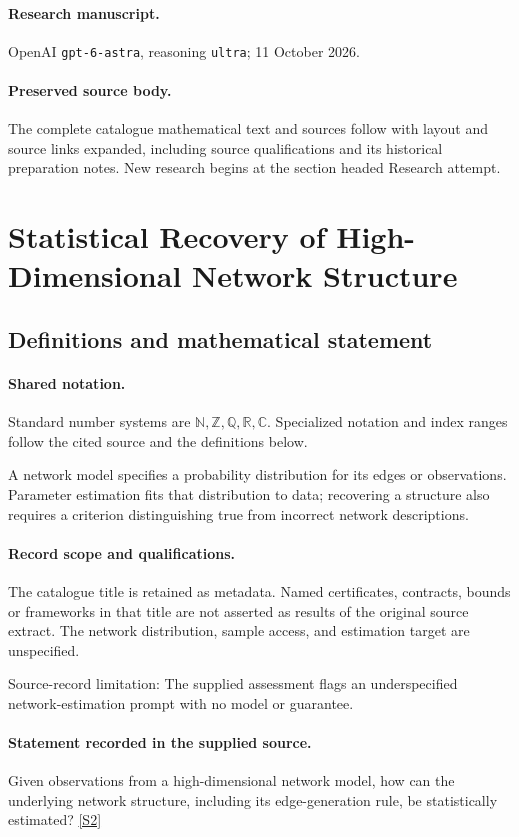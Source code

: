 \documentclass[11pt]{article}
\begin{document}
\paragraph{Research manuscript.} OpenAI \texttt{gpt-6-astra}, reasoning \texttt{ultra}; 11 October 2026.
\paragraph{Preserved source body.} The complete catalogue mathematical text and sources follow with layout and source links expanded, including source qualifications and its historical preparation notes. New research begins at the section headed Research attempt.

\section{Statistical Recovery of High-Dimensional Network Structure}\label{statement}

\subsection{Definitions and mathematical statement}

\paragraph{Shared notation.}Standard number systems are $\mathbb N,\mathbb Z,\mathbb Q,\mathbb R,\mathbb C$. Specialized notation and index ranges follow the cited source and the definitions below.


A network model specifies a probability distribution for its edges or observations. Parameter estimation fits that distribution to data; recovering a structure also requires a criterion distinguishing true from incorrect network descriptions.
\paragraph{Record scope and qualifications.}
The catalogue title is retained as metadata. Named certificates, contracts, bounds or frameworks in that title are not asserted as results of the original source extract.
The network distribution, sample access, and estimation target are unspecified.

Source-record limitation: The supplied assessment flags an underspecified network-estimation prompt with no model or guarantee.
\paragraph{Statement recorded in the supplied source.}
Given observations from a high-dimensional network model, how can the underlying network structure, including its edge-generation rule, be statistically estimated? \href{https://doi.org/10.4171/owr/2018/29}{[S2]}
\end{document}
